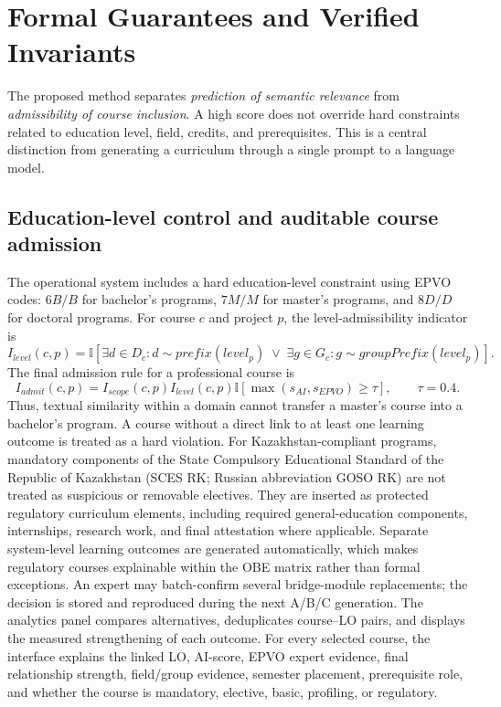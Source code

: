\documentclass[twoside,11pt]{article}
\begin{document}
\section{Formal Guarantees and Verified Invariants}

The proposed method separates \emph{prediction of semantic relevance} from \emph{admissibility of course inclusion}. A high score does not override hard constraints related to education level, field, credits, and prerequisites. This is a central distinction from generating a curriculum through a single prompt to a language model.

\subsection{Education-level control and auditable course admission}

The operational system includes a hard education-level constraint using EPVO codes: $6B/B$ for bachelor's programs, $7M/M$ for master's programs, and $8D/D$ for doctoral programs. For course $c$ and project $p$, the level-admissibility indicator is
\begin{equation}
I_{level}(c,p)=\mathbb{I}\left[\exists d\in D_c:d\sim prefix(level_p)\;\lor\;
\exists g\in G_c:g\sim groupPrefix(level_p)\right].
\end{equation}
The final admission rule for a professional course is
\begin{equation}
I_{admit}(c,p)=I_{scope}(c,p)I_{level}(c,p)
\mathbb{I}\left[\max(s_{AI},s_{EPVO})\geq\tau\right],\qquad \tau=0.4.
\label{eq:admission}
\end{equation}
Thus, textual similarity within a domain cannot transfer a master's course into a bachelor's program. A course without a direct link to at least one learning outcome is treated as a hard violation. For Kazakhstan-compliant programs, mandatory components of the State Compulsory Educational Standard of the Republic of Kazakhstan (SCES RK; Russian abbreviation GOSO RK) are not treated as suspicious or removable electives. They are inserted as protected regulatory curriculum elements, including required general-education components, internships, research work, and final attestation where applicable. Separate system-level learning outcomes are generated automatically, which makes regulatory courses explainable within the OBE matrix rather than formal exceptions. An expert may batch-confirm several bridge-module replacements; the decision is stored and reproduced during the next A/B/C generation. The analytics panel compares alternatives, deduplicates course--LO pairs, and displays the measured strengthening of each outcome. For every selected course, the interface explains the linked LO, AI-score, EPVO expert evidence, final relationship strength, field/group evidence, semester placement, prerequisite role, and whether the course is mandatory, elective, basic, profiling, or regulatory.
\end{document}
